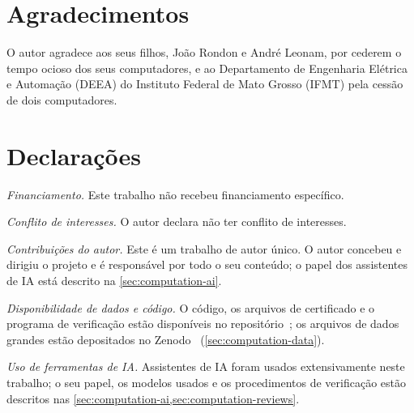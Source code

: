 \section*{Agradecimentos}

O autor agradece aos seus filhos, Jo\~ao Rondon e Andr\'e Leonam, por cederem o tempo ocioso dos seus
computadores, e ao Departamento de Engenharia Elétrica e Automação (DEEA) do Instituto Federal de Mato
Grosso (IFMT) pela cessão de dois computadores.

\section*{Declarações}

\emph{Financiamento.} Este trabalho não recebeu financiamento específico.

\emph{Conflito de interesses.} O autor declara não ter conflito de interesses.

\emph{Contribuições do autor.} Este é um trabalho de autor único. O autor concebeu e dirigiu o projeto e é
responsável por todo o seu conteúdo; o papel dos assistentes de IA está descrito na \cref{sec:computation-ai}.

\emph{Disponibilidade de dados e código.} O código, os arquivos de certificado e o programa de verificação estão
disponíveis no repositório~\cite{Repo2026}; os arquivos de dados grandes estão depositados no Zenodo~\cite{Zenodo2026}
(\cref{sec:computation-data}).

\emph{Uso de ferramentas de IA.} Assistentes de IA foram usados extensivamente neste trabalho; o seu papel, os modelos usados e
os procedimentos de verificação estão descritos nas \cref{sec:computation-ai,sec:computation-reviews}.

